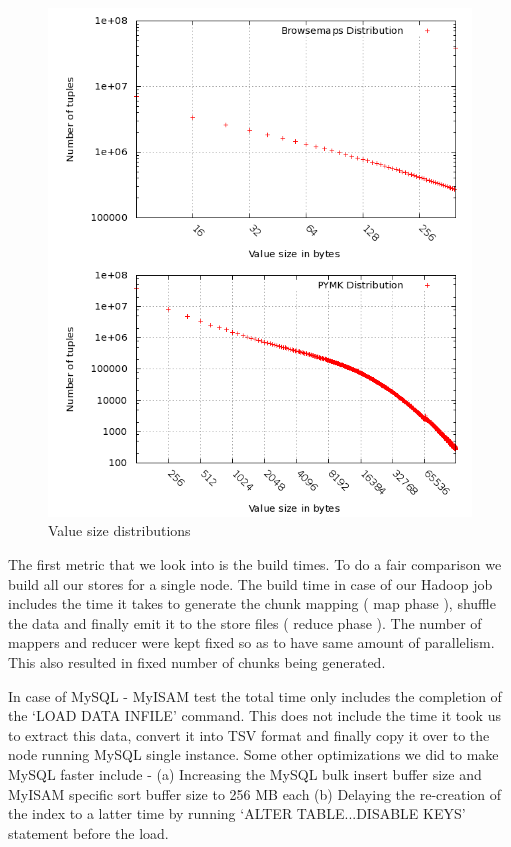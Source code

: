 \documentclass[10pt,twocolumn,preprint,natbib,authoryear]{sigplanconf}
\begin{document}
\begin{figure}
  \centering
    \includegraphics[scale=0.35]{distribution.png}
  \caption{Value size distributions}
  \label{distribution}
\end{figure}

The first metric that we look into is the build times. To do a fair comparison we build all our stores for a single node. The build time in case of our Hadoop job includes the time it takes to generate the chunk mapping ( map phase ), shuffle the data and finally emit it to the store files ( reduce phase ). The number of mappers and reducer were kept fixed so as to have same amount of parallelism. This also resulted in fixed number of chunks being generated.

In case of MySQL - MyISAM test the total time only includes the completion of the `LOAD DATA INFILE' command. This does not include the time it took us to extract this data, convert it into TSV format and finally copy it over to the node running MySQL single instance. Some other optimizations we did to make MySQL faster include - (a) Increasing the MySQL bulk insert buffer size and MyISAM specific sort buffer size to 256 MB each (b) Delaying the re-creation of the index to a latter time by running `ALTER TABLE...DISABLE KEYS' statement before the load. 
\end{document}
